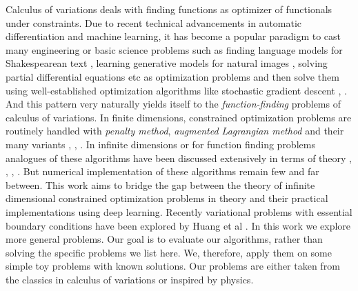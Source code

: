 Calculus of variations deals with finding functions as optimizer of functionals under constraints. Due to recent technical advancements in automatic differentiation and machine learning, it has become a popular paradigm to cast many engineering or basic science problems such as finding language models for Shakespearean text \cite{jhamtani2017shakespearizing}, learning generative models for natural images \cite{huang2018introduction}, solving partial differential equations \cite{blechschmidt2021three} etc as optimization problems and then solve them using well-established optimization algorithms like stochastic gradient descent \cite{ruder2016overview}, \cite{bottou2007tradeoffs}. And this pattern very naturally yields itself to the \textit{function-finding} problems of calculus of variations. In finite dimensions, constrained optimization problems are routinely handled with \textit{penalty method}, \textit{augmented Lagrangian method} and their many variants \cite{jorge2006numerical}, \cite{bonnans2006numerical}, \cite{bertsekas1995athena}. In infinite dimensions or for function finding problems analogues of these algorithms have been discussed extensively in terms of theory \cite{ito2008lagrange}, \cite{kanzow2018augmented}, \cite{dussault2007penalty}, \cite{fiacco1969generalized}. But numerical implementation of these algorithms remain few and far between. This work aims to bridge the gap between the theory of infinite dimensional constrained optimization problems in theory and their practical implementations using deep learning. Recently variational problems with essential boundary conditions have been explored by Huang et al \cite{huang2021augmented}. In this work we explore more general problems. Our goal is to evaluate our algorithms, rather than solving the specific problems we list here. We, therefore, apply them on some simple toy problems with known solutions. Our problems are either taken from the classics in calculus of variations or inspired by physics. 



